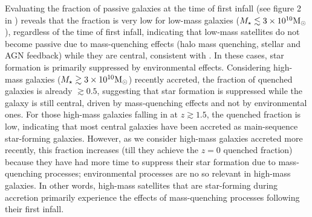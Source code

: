 \documentclass[baaa]{baaa}
\begin{document}
Evaluating the fraction of passive galaxies at the time of first infall (see figure 2 in \citealt{Cora_2019}) reveals that the fraction is very low for low-mass galaxies ($M_{\star} \lesssim 3 \times 10^{10}{\rm M}_{\odot}$), regardless of the time of first infall, indicating that low-mass satellites do not become passive due to mass-quenching effects (halo mass quenching, stellar and AGN feedback) while they are central, consistent with \cite{Wetzel_2013}. In these cases, star formation is primarily suppressed by environmental effects.
%
Considering high-mass galaxies ($M_{\star} \gtrsim 3 \times 10^{10}{\rm M}_{\odot}$) recently accreted, the fraction of quenched galaxies is already $\gtrsim 0.5$, suggesting that star formation is suppressed while the galaxy is still central, driven by mass-quenching effects and not by environmental ones. For those high-mass galaxies falling in at $z \gtrsim 1.5$, the quenched fraction is low, indicating that most central galaxies have been accreted as main-sequence star-forming galaxies. However, as we consider high-mass galaxies accreted more recently, this fraction increases (till they achieve the $z=0$ quenched fraction) because they have had more time to suppress their star formation due to mass-quenching processes; environmental processes are no so relevant in high-mass galaxies. In other words,
high-mass satellites that are star-forming
during accretion primarily experience the effects of mass-quenching processes following their first infall.
\end{document}
